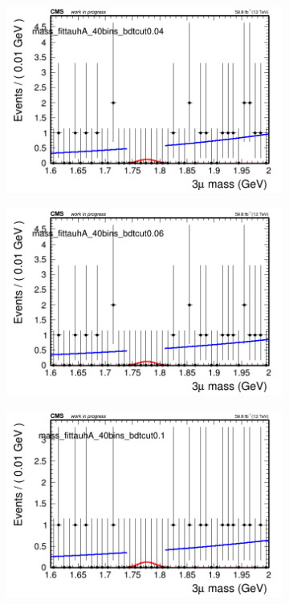 \begin{figure}[H]
\begin{subfigure}{0.2\textwidth}
        \includegraphics[width=\textwidth]{unfixed_exp/plots/tauhA/massfit_tauhA_40bins_bdtcut0.04.png}
        \caption{}
    \end{subfigure}
    \begin{subfigure}{0.2\textwidth}
        \includegraphics[width=\textwidth]{unfixed_exp/plots/tauhA/massfit_tauhA_40bins_bdtcut0.06.png}
        \caption{}
    \end{subfigure}
    \begin{subfigure}{0.2\textwidth}
        \includegraphics[width=\textwidth]{unfixed_exp/plots/tauhA/massfit_tauhA_40bins_bdtcut0.1.png}

\end{subfigure}
\end{figure}
